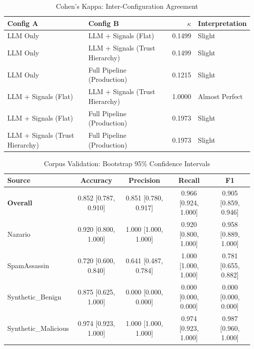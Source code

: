 \begin{table}[h]
\centering
\caption{Cohen's Kappa: Inter-Configuration Agreement}
\label{tab:e8_kappa}
\begin{tabular}{l l r l}
\hline
Config A & Config B & $\kappa$ & Interpretation \\
\hline
LLM Only & LLM + Signals (Flat) & 0.1499 & Slight \\
LLM Only & LLM + Signals (Trust Hierarchy) & 0.1499 & Slight \\
LLM Only & Full Pipeline (Production) & 0.1215 & Slight \\
LLM + Signals (Flat) & LLM + Signals (Trust Hierarchy) & 1.0000 & Almost Perfect \\
LLM + Signals (Flat) & Full Pipeline (Production) & 0.1973 & Slight \\
LLM + Signals (Trust Hierarchy) & Full Pipeline (Production) & 0.1973 & Slight \\
\hline
\end{tabular}
\end{table}

\begin{table}[h]
\centering
\caption{Corpus Validation: Bootstrap 95\% Confidence Intervals}
\label{tab:e8_corpus_ci}
\begin{tabular}{l c c c c}
\hline
Source & Accuracy & Precision & Recall & F1 \\
\hline
\textbf{Overall} & 0.852 [0.787, 0.910] & 0.851 [0.780, 0.917] & 0.966 [0.924, 1.000] & 0.905 [0.859, 0.946] \\
\hline
Nazario & 0.920 [0.800, 1.000] & 1.000 [1.000, 1.000] & 0.920 [0.800, 1.000] & 0.958 [0.889, 1.000] \\
SpamAssassin & 0.720 [0.600, 0.840] & 0.641 [0.487, 0.784] & 1.000 [1.000, 1.000] & 0.781 [0.655, 0.882] \\
Synthetic\_Benign & 0.875 [0.625, 1.000] & 0.000 [0.000, 0.000] & 0.000 [0.000, 0.000] & 0.000 [0.000, 0.000] \\
Synthetic\_Malicious & 0.974 [0.923, 1.000] & 1.000 [1.000, 1.000] & 0.974 [0.923, 1.000] & 0.987 [0.960, 1.000] \\
\hline
\end{tabular}
\end{table}